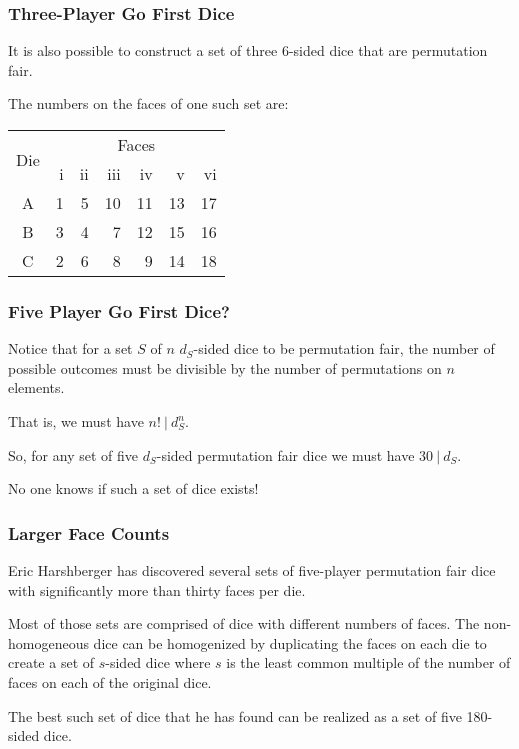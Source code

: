 \documentclass[aspectratio=169]{beamer}
\begin{document}
\begin{frame}[triangle=siiblue]
\frametitle{Three-Player Go First Dice}
It is also possible to construct a set of three 6-sided dice that are permutation fair. 

\vfill

The numbers on the faces of one such set are:
\begin{table}
\begin{tabular}{c rrrrrr} \toprule
\multirow{2}[2]{*}{Die} &  \multicolumn{6}{c}{Faces} \\ \cmidrule(lr){2-7}     
   & i & ii & iii & iv & v & vi \\ \midrule
A & 1 & 5 & 10 & 11 & 13 & 17 \\
B & 3 & 4 & 7 & 12 & 15 & 16 \\
C & 2 & 6 & 8 & 9 & 14 & 18 \\ \bottomrule
\end{tabular}
\end{table}
\end{frame}

\begin{frame}[triangle=siiblue]
\frametitle{Five Player Go First Dice?}
Notice that for a set $S$ of $n$ $d_S$-sided dice to be permutation fair,  the number of possible outcomes must be divisible by the number of permutations on $n$ elements.

\vfill

That is, we must have $n! \ \vert \ d_S^n$.

\vfill

So, for any set of five $d_S$-sided permutation fair dice we must have $ 30 \ \vert \ d_S$.

\vfill

No one knows if such a set of dice exists!
\end{frame}

\begin{frame}[triangle=siiblue]
\frametitle{Larger Face Counts}
Eric Harshberger has discovered several sets of five-player permutation fair dice with significantly more than thirty faces per die.

\vfill

Most of those sets are comprised of dice with different numbers of faces.  The non-homogeneous dice can be homogenized by duplicating the faces on each die to create a set of $s$-sided dice where $s$ is the least common multiple of the number of faces on each of the original dice.

\vfill

The best such set of dice that he has found can be realized as a set of five 180-sided dice.
\end{frame}
\end{document}
